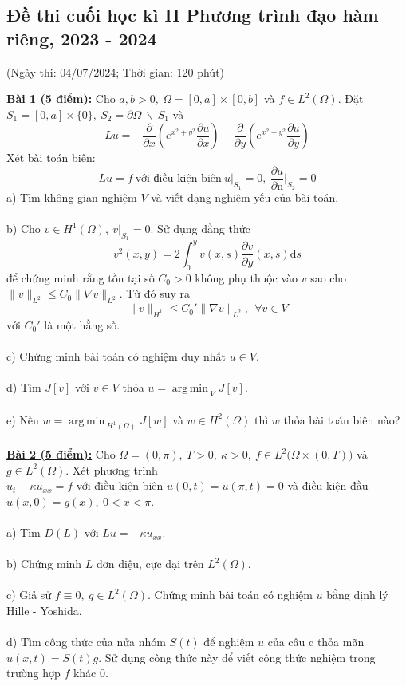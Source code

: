 \documentclass[10.5pt, a4paper]{article}
\DeclareMathOperator*{\argmin}{arg\,min\,}
\begin{document}
\subsection{Đề thi cuối học kì II Phương trình đạo hàm riêng, 2023 - 2024}
\begin{center}
	\color{blue}(Ngày thi: 04/07/2024; Thời gian: 120 phút)
\end{center}
\color{red}\underline{\textbf{Bài 1 (5 điểm):}} \color{black}Cho $a,b>0,~\Omega=[0,a]\times[0,b]$ và $f\in L^2(\Omega)$. Đặt $S_1=[0,a]\times\{0\},~S_2=\partial\Omega~\backslash~S_1$ và $$Lu=-\dfrac{\partial}{\partial x}\left(e^{x^2+y^2}\dfrac{\partial u}{\partial x}\right)-\dfrac{\partial}{\partial y}\left(e^{x^2+y^2}\dfrac{\partial u}{\partial y}\right)$$
Xét bài toán biên: $$Lu=f~\text{với điều kiện biên}~u\big|_{S_1}=0,~\dfrac{\partial u}{\partial\text{n}}\bigg|_{S_2}=0$$
\color{red}a) \color{black}Tìm không gian nghiệm $V$ và viết dạng nghiệm yếu của bài toán.\\\\
\color{red}b) \color{black}Cho $v\in H^1(\Omega),~v\big|_{S_1}=0$. Sử dụng đẳng thức $$v^2(x,y)=2\displaystyle\int_0^yv(x,s)\dfrac{\partial v}{\partial y}(x,s)\text{d}s$$ để chứng minh rằng tồn tại số $C_0>0$ không phụ thuộc vào $v$ sao cho $\lVert v\rVert_{L^2}\le C_0\lVert\nabla v\rVert_{L^2}$. Từ đó suy ra $$\lVert v\rVert_{H^1}\le C_0'\lVert\nabla v\rVert_{L^2},~~\forall v\in V$$
với $C_0'$ là một hằng số.\\\\
\color{red}c) \color{black}Chứng minh bài toán có nghiệm duy nhất $u\in V$.\\\\
\color{red}d) \color{black}Tìm $J[v]$ với $v\in V$ thỏa $u=\displaystyle\argmin_VJ[v]$.\\\\
\color{red}e) \color{black}Nếu $w=\displaystyle\argmin_{H^1(\Omega)}J[w]$ và $w\in H^2(\Omega)$ thì $w$ thỏa bài toán biên nào?\\\\
\color{red}\underline{\textbf{Bài 2 (5 điểm):}} \color{black}Cho $\Omega=(0,\pi),~T>0,~\kappa>0,~f\in L^2\big(\Omega\times(0,T)\big)$ và $g\in L^2(\Omega)$. Xét phương trình\\$u_t-\kappa u_{xx}=f$ với điều kiện biên $u(0,t)=u(\pi,t)=0$ và điều kiện đầu $u(x,0)=g(x),~0<x<\pi$.\\\\
\color{red}a) \color{black}Tìm $D(L)$ với $Lu=-\kappa u_{xx}$.\\\\
\color{red}b) \color{black}Chứng minh $L$ đơn điệu, cực đại trên $L^2(\Omega)$.\\\\
\color{red}c) \color{black}Giả sử $f\equiv0,~g\in L^2(\Omega)$. Chứng minh bài toán có nghiệm $u$ bằng định lý Hille - Yoshida.\\\\
\color{red}d) \color{black}Tìm công thức của nửa nhóm $S(t)$ để nghiệm $u$ của câu c thỏa mãn $u(x,t)=S(t)g$. Sử dụng công thức này để viết công thức nghiệm trong trường hợp $f$ khác 0.
\end{document}
